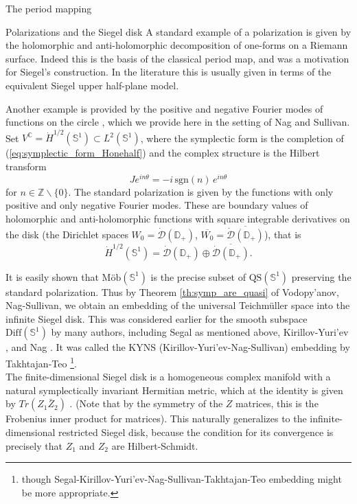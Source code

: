\documentclass[12pt]{amsart}
\newcommand{\disk}{\ensuremath{\mathbb{D}} } %
\theoremstyle{plain}
\theoremstyle{definition}
\theoremstyle{remark}
\numberwithin{equation}{section} %
\numberwithin{figure}{section} %
\begin{document}
\begin{section}{The period mapping}
\begin{subsection}{Polarizations and the Siegel disk}
  A standard example of a polarization is given by the holomorphic and anti-holomorphic decomposition of one-forms on a Riemann surface. Indeed this is the basis of the classical period map, and was a motivation for Siegel's construction. In the literature this is usually given in terms of the equivalent Siegel upper half-plane model.  
  
  Another example is provided by the positive and negative Fourier modes of functions on the circle \cite{SegalUnitary}, which we provide here in the setting of Nag and Sullivan. Set $V^{\mathbb{C}} = \dot{H}^{1/2}(\mathbb{S}^1) \subset L^2(\mathbb{S}^1)$, where the symplectic form is the completion of (\eqref{eq:symplectic_form_Honehalf}) and the complex structure is the Hilbert transform 
  \[  J e^{i n \theta} = -i \, \mathrm{sgn}(n) \, e^{i n \theta}  \]
  for $n \in \mathbb{Z} \backslash \{0\}$. The standard polarization is given by the functions with only positive and only negative Fourier modes. These are boundary values of holomorphic and anti-holomorphic functions with square integrable derivatives on the disk (the Dirichlet spaces $W_0=\dot{\mathcal{D}}(\disk_+)$, $\overline{W_0}=\overline{\dot{\mathcal{D}}(\disk_+)}$), that is   
  \[    \dot{H}^{1/2}(\mathbb{S}^1) = \dot{\mathcal{D}}(\disk_+) 
  \oplus \overline{\dot{\mathcal{D}}(\disk_+)}. \]
  
  It is easily shown that $\text{M\"ob}(\mathbb{S}^1)$ is the precise subset of $\text{QS}(\mathbb{S}^1)$ preserving the standard polarization. 
  Thus by Theorem \ref{th:symp_are_quasi} of Vodopy'anov, Nag-Sullivan, we obtain an embedding of the universal Teichm\"uller space into the infinite Siegel disk. 
  This was considered earlier for the smooth subspace $\mathrm{Diff}(\mathbb{S}^1)$ by many authors, including Segal \cite{SegalUnitary}  as mentioned above, Kirillov-Yuri'ev \cite{KY2}, and Nag \cite{Nag_bulletin}. It was called the KYNS (Kirillov-Yuri'ev-Nag-Sullivan) embedding by Takhtajan-Teo \cite{Takhtajan_Teo_Memoirs}\footnote{though Segal-Kirillov-Yuri'ev-Nag-Sullivan-Takhtajan-Teo embedding might be more appropriate.}. \\
  
  The finite-dimensional Siegel disk is a homogeneous complex manifold with a natural symplectically invariant Hermitian metric, which at the identity is given by $Tr (Z_1 \bar{Z}_2)$ \cite{Siegel_symplectic_book}.  (Note that by the symmetry of the $Z$ matrices, this is the Frobenius inner product for matrices).  This naturally generalizes to the infinite-dimensional restricted Siegel disk, because the condition for its convergence is precisely that $Z_1$ and $Z_2$ are Hilbert-Schmidt.\\ 


\end{subsection}
\end{section}
\end{document}
